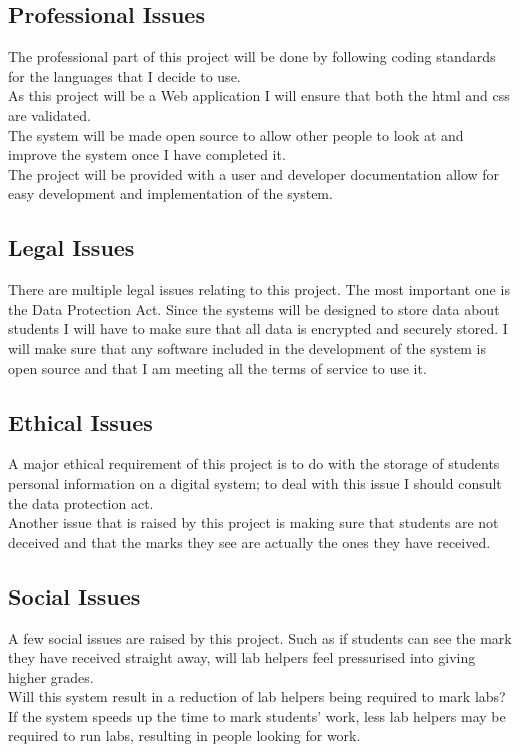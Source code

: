 \documentclass[12pt]{article}  %
\theoremstyle{definition}
\theoremstyle{remark}
\begin{document}
\newpage

\subsection{Professional Issues}
The professional part of this project will be done by following coding standards for the languages that I decide to use.\\
As this project will be a Web application I will ensure that both the html and css are validated.\\
The system will be made open source to allow other people to look at and improve the system once I have completed it.\\
The project will be provided with a  user and developer documentation allow for easy development and implementation of the system.


\subsection{Legal Issues}
There are multiple legal issues relating to this project. The most important one is the Data Protection Act. Since the systems will be designed to store data about students I will have to make sure that all data is encrypted and securely stored.
I will make sure that any software included in the development of the system is open source and that I am meeting all the terms of service to use it.


\subsection{Ethical Issues}
A major ethical requirement of this project is to do with the storage of students personal information on a digital system; to deal with this issue I should consult the data protection act. \\
Another issue that is raised by this project is making sure that students are not deceived and that the marks they see are actually the ones they have received.


\subsection{Social Issues}
A few social issues are raised by this project. Such as if students can see the mark they have received straight away, will lab helpers feel pressurised into giving higher grades.\\
Will this system result in a reduction of lab helpers being required to mark labs? If the system speeds up the time to mark students’ work, less lab helpers may be required to run labs, resulting in people looking for work.







\newpage


\end{document}
